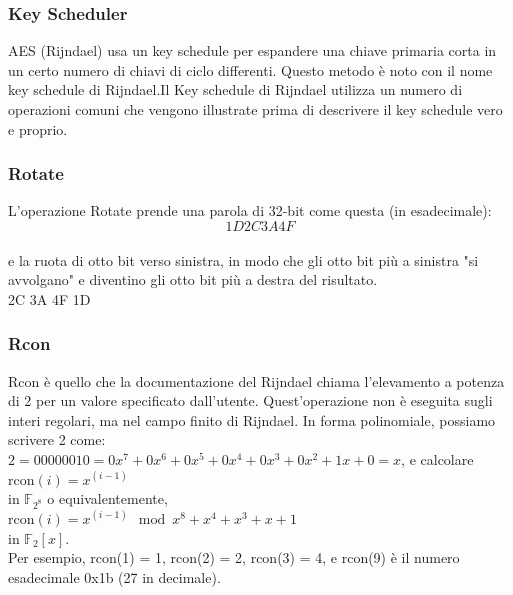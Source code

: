 \documentclass[10pt,a4paper]{article}
\begin{document}
\subsubsection{Key Scheduler}
AES (Rijndael) usa un key schedule per espandere una chiave primaria corta in un certo numero di chiavi di ciclo differenti. Questo metodo è noto con il nome key schedule di Rijndael.Il Key schedule di Rijndael utilizza un numero di operazioni comuni che vengono illustrate prima di descrivere il key schedule vero e proprio.
\subsubsection{Rotate}
L'operazione Rotate prende una parola di 32-bit come questa (in esadecimale):\\
$$1D 2C 3A 4F$$\\
e la ruota di otto bit verso sinistra, in modo che gli otto bit più a sinistra "si avvolgano" e diventino gli otto bit più a destra del risultato.\\
2C 3A 4F 1D\\

\subsubsection{Rcon}
Rcon è quello che la documentazione del Rijndael chiama l'elevamento a potenza di 2 per un valore specificato dall'utente. Quest'operazione non è eseguita sugli interi regolari, ma nel campo finito di Rijndael. In forma polinomiale, possiamo scrivere 2 come:\\
$ 2 = 00000010 = 0 x^7 + 0 x^6 + 0 x^5 + 0 x^4 + 0 x^3 + 0 x^2 + 1 x + 0 = x$, e calcolare\\
$\textrm{rcon}(i) = x^{(i-1)}$\\
in $\mathbb{F}_{2^8}$ o equivalentemente,\\
$\textrm{rcon}(i) = x^{(i-1)} \mod x^8 + x^4 + x^3 + x + 1$\\
in $\mathbb{F}_{2}[x]$.\\
Per esempio, rcon(1) = 1, rcon(2) = 2, rcon(3) = 4, e rcon(9) è il numero esadecimale 0x1b (27 in decimale).
\end{document}
